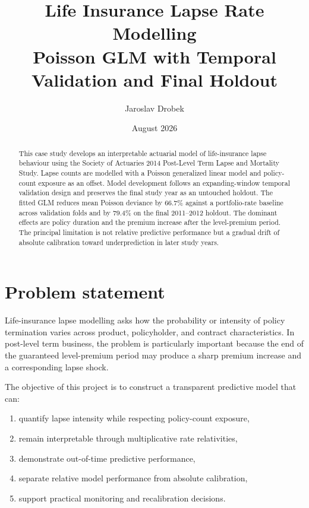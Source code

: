 \documentclass[11pt,a4paper]{article}
\title{\vspace{-1cm}\textbf{Life Insurance Lapse Rate Modelling}\\\large Poisson GLM with Temporal Validation and Final Holdout}
\author{Jaroslav Drobek}
\date{August 2026}
\theoremstyle{definition}
\begin{document}
\maketitle

\begin{abstract}
This case study develops an interpretable actuarial model of life-insurance lapse behaviour using the Society of Actuaries 2014 Post-Level Term Lapse and Mortality Study. Lapse counts are modelled with a Poisson generalized linear model and policy-count exposure as an offset. Model development follows an expanding-window temporal validation design and preserves the final study year as an untouched holdout. The fitted GLM reduces mean Poisson deviance by 66.7\% against a portfolio-rate baseline across validation folds and by 79.4\% on the final 2011--2012 holdout. The dominant effects are policy duration and the premium increase after the level-premium period. The principal limitation is not relative predictive performance but a gradual drift of absolute calibration toward underprediction in later study years.
\end{abstract}

\tableofcontents
\newpage

\section{Problem statement}
Life-insurance lapse modelling asks how the probability or intensity of policy termination varies across product, policyholder, and contract characteristics. In post-level term business, the problem is particularly important because the end of the guaranteed level-premium period may produce a sharp premium increase and a corresponding lapse shock.

The objective of this project is to construct a transparent predictive model that can:
\begin{enumerate}
\item quantify lapse intensity while respecting policy-count exposure,
\item remain interpretable through multiplicative rate relativities,
\item demonstrate out-of-time predictive performance,
\item separate relative model performance from absolute calibration,
\item support practical monitoring and recalibration decisions.
\end{enumerate}
\end{document}
